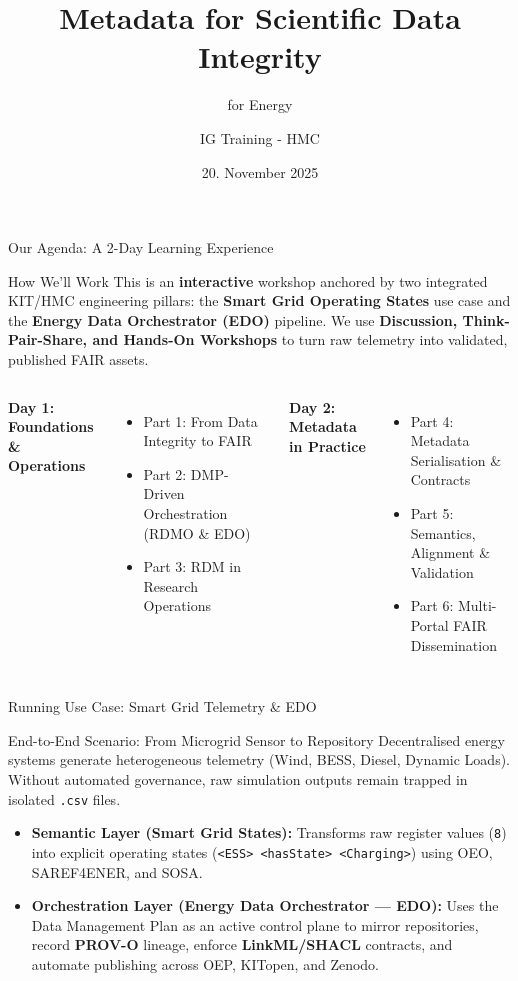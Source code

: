 \documentclass[aspectratio=169]{beamer}
\title{Metadata for Scientific Data Integrity}
\subtitle{for Energy}
\author{IG Training - HMC}
\date{20. November 2025}
\let\pause\relax
\begin{document}
\begin{frame}
    \titlepage
\end{frame}

\begin{frame}{Our Agenda: A 2-Day Learning Experience}
    \begin{block}{How We'll Work}
        This is an \textbf{interactive} workshop anchored by two integrated KIT/HMC engineering pillars: the \textbf{Smart Grid Operating States} use case and the \textbf{Energy Data Orchestrator (EDO)} pipeline. We use \textbf{Discussion, Think-Pair-Share, and Hands-On Workshops} to turn raw telemetry into validated, published FAIR assets.
    \end{block}

    \begin{columns}
        \textbf{Day 1: Foundations \& Operations}
        \begin{itemize}
            \item Part 1: From Data Integrity to FAIR
            \item Part 2: DMP-Driven Orchestration (RDMO \& EDO)
            \item Part 3: RDM in Research Operations
        \end{itemize}
        
        \textbf{Day 2: Metadata in Practice}
        \begin{itemize}
            \item Part 4: Metadata Serialisation \& Contracts
            \item Part 5: Semantics, Alignment \& Validation
            \item Part 6: Multi-Portal FAIR Dissemination
        \end{itemize}
    \end{columns}
\end{frame}

\begin{frame}{Running Use Case: Smart Grid Telemetry \& EDO}
    \begin{block}{End-to-End Scenario: From Microgrid Sensor to Repository}
        Decentralised energy systems generate heterogeneous telemetry (Wind, BESS, Diesel, Dynamic Loads). Without automated governance, raw simulation outputs remain trapped in isolated \texttt{.csv} files.
    \end{block}
    \pause
    \begin{itemize}
        \item \textbf{Semantic Layer (Smart Grid States):} Transforms raw register values (\texttt{8}) into explicit operating states (\texttt{<ESS> <hasState> <Charging>}) using OEO, SAREF4ENER, and SOSA.
        \item \textbf{Orchestration Layer (Energy Data Orchestrator — EDO):} Uses the Data Management Plan as an active control plane to mirror repositories, record \textbf{PROV-O} lineage, enforce \textbf{LinkML/SHACL} contracts, and automate publishing across OEP, KITopen, and Zenodo.
    \end{itemize}
\end{frame}
\end{document}
